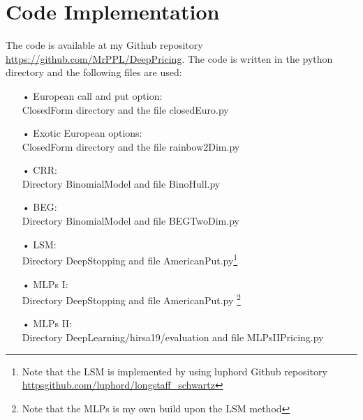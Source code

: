 \chapter{Code Implementation} %

\label{AppendixD} %

The code is available at my Github repository \href{https://github.com/MrPPL/DeepPricing}{https://github.com/MrPPL/DeepPricing}. The code is written in the python directory and the following files are used:
\begin{enumerate}
\item[•] European call and put option:\\
ClosedForm directory and the file closedEuro.py
\item[•] Exotic European options:\\
ClosedForm directory and the file rainbow2Dim.py
\item[•] CRR:\\
Directory BinomialModel and file BinoHull.py
\item[•] BEG:\\
Directory BinomialModel and file BEGTwoDim.py
\item[•] LSM:\\
Directory DeepStopping and file AmericanPut.py\footnote{Note that the LSM is implemented by using luphord Github repository \href{https://github.com/luphord/longstaff_schwartz}{https\:\/\/github.com/luphord/longstaff\_schwartz}}
\item[•] MLPs I:\\
Directory DeepStopping and file AmericanPut.py \footnote{Note that the MLPs is my own build upon the LSM method}
\item[•] MLPs II:\\
Directory DeepLearning/hirsa19/evaluation and file MLPsIIPricing.py
\end{enumerate}
